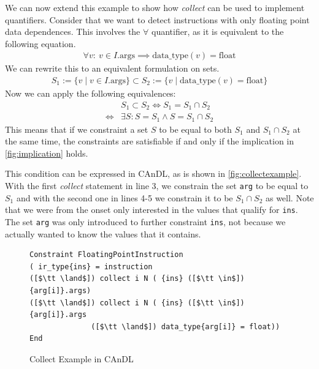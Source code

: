     We can now extend this example to show how {\it collect} can be used to
    implement quantifiers.
    Consider that we want to detect instructions with only floating point data
    dependences.
    This involves the $\forall$ quantifier, as it is equivalent to
    the following equation.
    \begin{align}
        \forall v\colon\ v\in I.\text{args}\implies\text{data\_type}(v)=\text{float}
    \label{fig:implication}
    \end{align}
    We can rewrite this to an equivalent formulation on sets.
    \begin{align*}
        S_1:= \{v\mid v\in I.\text{args}\}\subset S_2:={}\{v\mid\text{data\_type}(v)=\text{float}\}
    \end{align*}
    Now we can apply the following equivalences:
    \begin{align*}
        &S_1\subset S_2\Leftrightarrow{}S_1 = S_1\cap S_2\\
        \Leftrightarrow{}&\exists S\colon S=S_1\land S=S_1\cap S_2
    \end{align*}
    This means that if we constraint a set $S$ to be equal to both $S_1$ and
    $S_1\cap S_2$ at the same time, the constraints are satisfiable if and only
    if the implication in \autoref{fig:implication} holds.

    This condition can be expressed in CAnDL, as is shown in
    \autoref{fig:collectexample}.
    With the first {\it collect} statement in line 3, we constrain the set
    \texttt{arg} to be equal to $S_1$ and with the second one in lines 4-5 we
    constrain it to be $S_1\cap S_2$ as well.
    Note that we were from the onset only interested in the values that qualify
    for \texttt{ins}.
    The set \texttt{arg} was only introduced to further constraint \texttt{ins},
    not because we actually wanted to know the values that it contains.

\begin{figure}[ht]
\begin{lstlisting}[language=CAnDL]
Constraint FloatingPointInstruction
( ir_type{ins} = instruction
([$\tt \land$]) collect i N ( {ins} ([$\tt \in$]) {arg[i]}.args)
([$\tt \land$]) collect i N ( {ins} ([$\tt \in$]) {arg[i]}.args
              ([$\tt \land$]) data_type{arg[i]} = float))
End
\end{lstlisting}
\vspace{-0.3cm}
\caption{Collect Example in CAnDL}
\label{fig:collectexample}
\end{figure}

